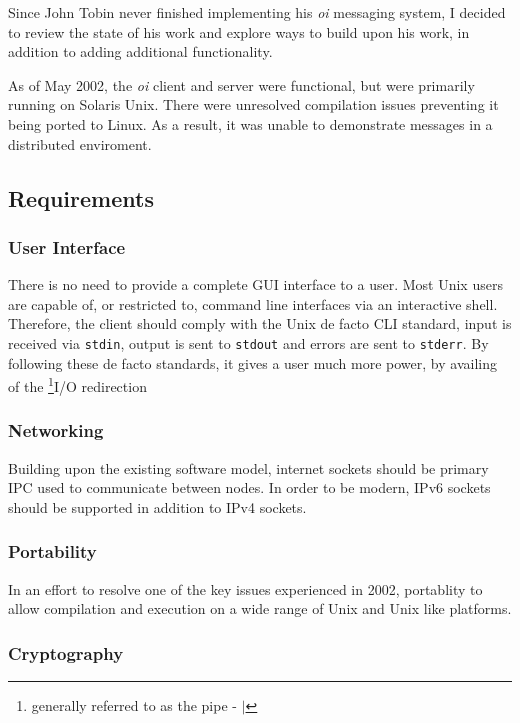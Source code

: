 
Since John Tobin never finished implementing his \emph{oi} messaging
system, I decided to review the state of his work and explore ways to
build upon his work, in addition to adding additional functionality.


As of May 2002, the \emph{oi} client and server were functional, but
were primarily running on Solaris Unix. There were unresolved
compilation issues preventing it being ported to Linux. As a result, it
was unable to demonstrate messages in a distributed enviroment.

\subsection{Requirements}

\subsubsection{User Interface}

There is no need to provide a complete GUI interface to a user. Most
Unix users are capable of, or restricted to, command line interfaces via
an interactive shell. Therefore, the client should comply with the 
Unix de facto CLI standard, input is received via \verb!stdin!, output
is sent to \verb!stdout! and errors are sent to \verb!stderr!. By
following these de facto standards, it gives a user much more power, by
availing of the 
\footnote{generally referred to as the pipe - $\mid$}{I/O redirection}

\subsubsection{Networking}

Building upon the existing software model, internet sockets should be 
primary IPC used to communicate between nodes. In order to be modern,
IPv6 sockets should be supported in addition to IPv4 sockets.

\subsubsection{Portability}

In an effort to resolve one of the key issues experienced in 2002, 
portablity to allow compilation and execution on a wide range of Unix
and Unix like platforms.

\subsubsection{Cryptography}

